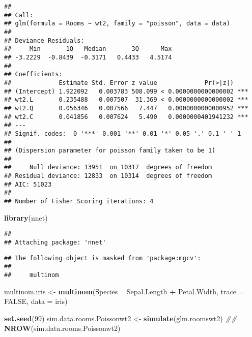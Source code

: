 \documentclass[
]{article}
\newenvironment{Shaded}{\begin{snugshade}}{\end{snugshade}}
\newcommand{\CommentTok}[1]{\textcolor[rgb]{0.56,0.35,0.01}{\textit{#1}}}
\newcommand{\DataTypeTok}[1]{\textcolor[rgb]{0.13,0.29,0.53}{#1}}
\newcommand{\DecValTok}[1]{\textcolor[rgb]{0.00,0.00,0.81}{#1}}
\newcommand{\KeywordTok}[1]{\textcolor[rgb]{0.13,0.29,0.53}{\textbf{#1}}}
\newcommand{\NormalTok}[1]{#1}
\newcommand{\OperatorTok}[1]{\textcolor[rgb]{0.81,0.36,0.00}{\textbf{#1}}}
\newcommand{\OtherTok}[1]{\textcolor[rgb]{0.56,0.35,0.01}{#1}}
\newcommand{\StringTok}[1]{\textcolor[rgb]{0.31,0.60,0.02}{#1}}
\begin{document}
\begin{verbatim}
## 
## Call:
## glm(formula = Rooms ~ wt2, family = "poisson", data = data)
## 
## Deviance Residuals: 
##     Min       1Q   Median       3Q      Max  
## -3.2229  -0.8439  -0.3171   0.4433   4.5174  
## 
## Coefficients:
##             Estimate Std. Error z value             Pr(>|z|)    
## (Intercept) 1.922092   0.003783 508.099 < 0.0000000000000002 ***
## wt2.L       0.235488   0.007507  31.369 < 0.0000000000000002 ***
## wt2.Q       0.056346   0.007566   7.447   0.0000000000000952 ***
## wt2.C       0.041856   0.007624   5.490   0.0000000401941232 ***
## ---
## Signif. codes:  0 '***' 0.001 '**' 0.01 '*' 0.05 '.' 0.1 ' ' 1
## 
## (Dispersion parameter for poisson family taken to be 1)
## 
##     Null deviance: 13951  on 10317  degrees of freedom
## Residual deviance: 12833  on 10314  degrees of freedom
## AIC: 51023
## 
## Number of Fisher Scoring iterations: 4
\end{verbatim}

\begin{Shaded}
\begin{Highlighting}[]
\KeywordTok{library}\NormalTok{(nnet)}
\end{Highlighting}
\end{Shaded}

\begin{verbatim}
## 
## Attaching package: 'nnet'
\end{verbatim}

\begin{verbatim}
## The following object is masked from 'package:mgcv':
## 
##     multinom
\end{verbatim}

\begin{Shaded}
\begin{Highlighting}[]
\NormalTok{multinom.iris <-}\StringTok{ }\KeywordTok{multinom}\NormalTok{(Species }\OperatorTok{~}\StringTok{ }\NormalTok{Sepal.Length }\OperatorTok{+}
\NormalTok{Petal.Width,}
\DataTypeTok{trace =} \OtherTok{FALSE}\NormalTok{,}
\DataTypeTok{data =}\NormalTok{ iris)}
\end{Highlighting}
\end{Shaded}

\begin{Shaded}
\begin{Highlighting}[]
\KeywordTok{set.seed}\NormalTok{(}\DecValTok{99}\NormalTok{)}
\NormalTok{sim.data.rooms.Poissonwt2 <-}\StringTok{ }\KeywordTok{simulate}\NormalTok{(glm.roomswt2)}
\CommentTok{##}
\KeywordTok{NROW}\NormalTok{(sim.data.rooms.Poissonwt2)}
\end{Highlighting}
\end{Shaded}
\end{document}
